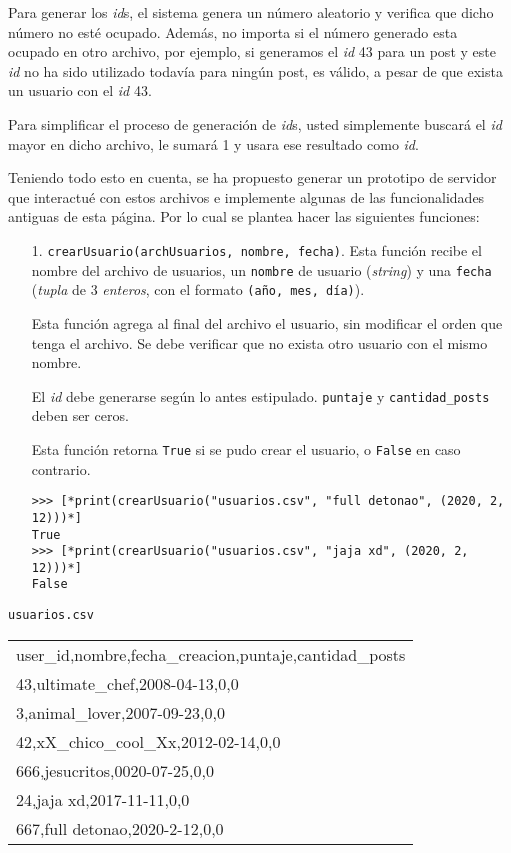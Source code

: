 Para generar los \textit{id}s, el sistema genera un número aleatorio y verifica que dicho número no esté ocupado. Además, no importa si el número generado esta ocupado en otro archivo, por ejemplo, si generamos el \textit{id} 43 para un post y este \textit{id} no ha sido utilizado todavía para ningún post, es válido, a pesar de que exista un usuario con el \textit{id} 43.

Para simplificar el proceso de generación de \textit{id}s, usted simplemente buscará el \textit{id} mayor en dicho archivo, le sumará 1 y usara ese resultado como \textit{id}.


Teniendo todo esto en cuenta, se ha propuesto generar un prototipo de servidor que interactué con estos archivos e implemente algunas de las funcionalidades antiguas de esta página. Por lo cual se plantea hacer las siguientes funciones:

\begin{enumerate}
    \item[1.] \texttt{crearUsuario(archUsuarios, nombre, fecha)}. Esta función recibe el nombre del archivo de usuarios, un \texttt{nombre} de usuario (\textit{string}) y una \texttt{fecha} (\textit{tupla} de 3 \textit{enteros}, con el formato \texttt{(año, mes, día)}).

    Esta función agrega al final del archivo el usuario, sin modificar el orden que tenga el archivo. Se debe verificar que no exista otro usuario con el mismo nombre.

    El \textit{id} debe generarse según lo antes estipulado. \texttt{puntaje} y \texttt{cantidad\_posts} deben ser ceros.

    Esta función retorna \texttt{True} si se pudo crear el usuario, o \texttt{False} en caso contrario.

    \begin{lstlisting}[style=consola]
>>> [*print(crearUsuario("usuarios.csv", "full detonao", (2020, 2, 12)))*]
True
>>> [*print(crearUsuario("usuarios.csv", "jaja xd", (2020, 2, 12)))*]
False
    \end{lstlisting}

\end{enumerate}

\begin{center}
    \texttt{usuarios.csv} \\
	\begin{tabular}{|l|}
		\hline
user\_id,nombre,fecha\_creacion,puntaje,cantidad\_posts\\
43,ultimate\_chef,2008-04-13,0,0\\
3,animal\_lover,2007-09-23,0,0\\
42,xX\_chico\_cool\_Xx,2012-02-14,0,0\\
666,jesucritos,0020-07-25,0,0\\
24,jaja xd,2017-11-11,0,0\\
667,full detonao,2020-2-12,0,0 \\
		\hline
	\end{tabular}
\end{center}

